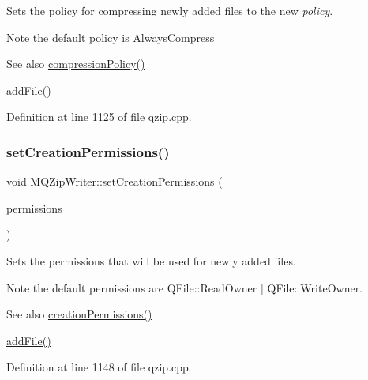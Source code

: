 Sets the policy for compressing newly added files to the new {\itshape policy}.

\begin{DoxyNote}{Note}
the default policy is Always\+Compress
\end{DoxyNote}
\begin{DoxySeeAlso}{See also}
\hyperlink{class_m_q_zip_writer_aa43250ac355d31da13d5eaa018d50c15}{compression\+Policy()} 

\hyperlink{class_m_q_zip_writer_af6d89acc4efc589f0c90c985106e2b00}{add\+File()} 
\end{DoxySeeAlso}


Definition at line 1125 of file qzip.\+cpp.

\mbox{\label{class_m_q_zip_writer_af965ba3d12531a91ca0c83e25423a313}} 
\subsubsection{\texorpdfstring{set\+Creation\+Permissions()}{setCreationPermissions()}}
{\footnotesize\ttfamily void M\+Q\+Zip\+Writer\+::set\+Creation\+Permissions (\begin{DoxyParamCaption}\item[{Q\+File\+::\+Permissions}]{permissions }\end{DoxyParamCaption})}

Sets the permissions that will be used for newly added files.

\begin{DoxyNote}{Note}
the default permissions are Q\+File\+::\+Read\+Owner $\vert$ Q\+File\+::\+Write\+Owner.
\end{DoxyNote}
\begin{DoxySeeAlso}{See also}
\hyperlink{class_m_q_zip_writer_a7ee2e99567e134f338093929469ab818}{creation\+Permissions()} 

\hyperlink{class_m_q_zip_writer_af6d89acc4efc589f0c90c985106e2b00}{add\+File()} 
\end{DoxySeeAlso}


Definition at line 1148 of file qzip.\+cpp.

\mbox{\label{class_m_q_zip_writer_a89cf6db4ed393de1791468e6aad7a99e}} 
